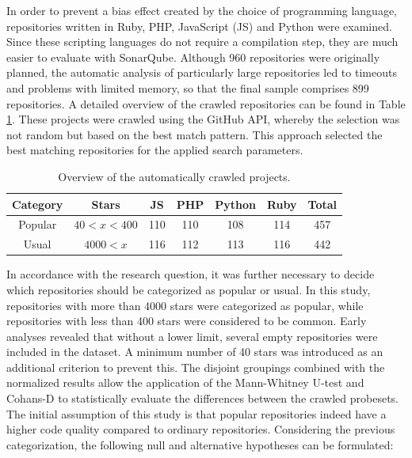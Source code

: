 \documentclass[a4paper, 12pt]{article}
\begin{document}
In order to prevent a bias effect created by the choice of programming language, repositories written in Ruby, PHP, JavaScript (JS) and Python were examined. Since these scripting languages do not require a compilation step, they are much easier to evaluate with SonarQube. Although 960 repositories were originally planned, the automatic analysis of particularly large repositories led to timeouts and problems with limited memory, so that the final sample comprises 899 repositories. A detailed overview of the crawled repositories can be found in Table \ref{tab:repo_counts}. These projects were crawled using the GitHub API\autocite{GitHub-Api}, whereby the selection was not random but based on the best match pattern. This approach selected the best matching repositories for the applied search parameters.

\begin{table}[ht]
\centering
\begin{tabular}{|c|c|c|c|c|c|c|}
\hline
\textbf{Category} & \textbf{Stars} & \textbf{JS} & \textbf{PHP} & \textbf{Python} & \textbf{Ruby} & \textbf{Total} \\
\hline
Popular & $40 < x < 400$ & 110 & 110 & 108 & 114 & 457\\
\hline
Usual & $ 4000 < x $ & 116 & 112 & 113 & 116 & 442 \\
\hline
\end{tabular}
\caption{Overview of the automatically crawled projects.}
\label{tab:repo_counts}
\end{table}

In accordance with the research question, it was further necessary to decide which repositories should be categorized as popular or usual. In this study, repositories with more than 4000 stars were categorized as popular, while repositories with less than 400 stars were considered to be common. Early analyses revealed that without a lower limit, several empty repositories were included in the dataset. A minimum number of 40 stars was introduced as an additional criterion to prevent this. The disjoint groupings combined with the normalized results allow the application of the Mann-Whitney U-test and Cohans-D to statistically evaluate the differences between the crawled probesets.\\

The initial assumption of this study is that popular repositories indeed have a higher code quality compared to ordinary repositories. Considering the previous categorization, the following null and alternative hypotheses can be formulated:
\end{document}
